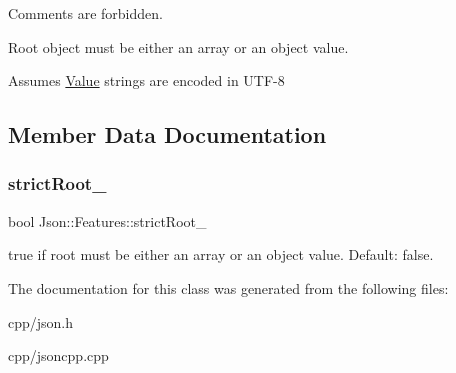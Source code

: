 \begin{DoxyItemize}
\item Comments are forbidden.
\item Root object must be either an array or an object value.
\item Assumes \hyperlink{class_json_1_1_value}{Value} strings are encoded in U\+T\+F-\/8 
\end{DoxyItemize}

\subsection{Member Data Documentation}
\mbox{\label{class_json_1_1_features_a1162c37a1458adc32582b585b552f9c3}} 
\subsubsection{\texorpdfstring{strict\+Root\+\_\+}{strictRoot\_}}
{\footnotesize\ttfamily bool Json\+::\+Features\+::strict\+Root\+\_\+}

{\ttfamily true} if root must be either an array or an object value. Default\+: {\ttfamily false}. 

The documentation for this class was generated from the following files\+:\begin{DoxyCompactItemize}
\item 
cpp/json.\+h\item 
cpp/jsoncpp.\+cpp\end{DoxyCompactItemize}
